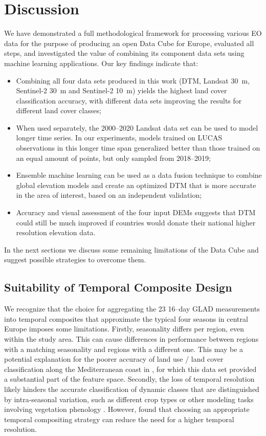 
\section*{Discussion}

We have demonstrated a full methodological framework for processing various EO data for the purpose of producing an open Data Cube for Europe, evaluated all steps, and investigated the value of combining its component data sets using machine learning applications. Our key findings indicate that:
\begin{itemize}[noitemsep]
\item Combining all four data sets produced in this work (DTM, Landsat 30~m, Sentinel-2 30~m and Sentinel-2 10~m) yields the highest land cover classification accuracy, with different data sets improving the results for different land cover classes;
\item When used separately, the 2000--2020 Landsat data set can be used to model longer time series. In our experiments, models trained on LUCAS observations in this longer time span generalized better than those trained on an equal amount of points, but only sampled from 2018--2019;
\item Ensemble machine learning can be used as a data fusion technique to combine global elevation models and create an optimized DTM that is more accurate in the area of interest, based on an independent validation;
\item Accuracy and visual assessment of the four input DEMs suggests that DTM could still be much improved if countries would donate their national higher resolution elevation data.
\end{itemize}

In the next sections we discuss some remaining limitations of the Data Cube and suggest possible strategies to overcome them.

\subsection*{Suitability of Temporal Composite Design}

We recognize that the choice for aggregating the 23 {\texttimes} 16--day GLAD measurements into temporal composites that approximate the typical four seasons in central Europe imposes some limitations. Firstly, seasonality differs per region, even within the study area. This can cause differences in performance between regions with a matching seasonality and regions with a different one. This may be a potential explanation for the poorer accuracy of land use / land cover classification along the Mediterranean coast in \citet{witjes2022spatiotemporal}, for which this data set provided a substantial part of the feature space. Secondly, the loss of temporal resolution likely hinders the accurate classification of dynamic classes that are distinguished by intra-seasonal variation, such as different crop types \citep{vuolo2018much} or other modeling tasks involving vegetation phenology \citep{zhao2011evaluation}. However, \citet{zhao2022temporal} found that choosing an appropriate temporal compositing strategy can reduce the need for a higher temporal resolution.

